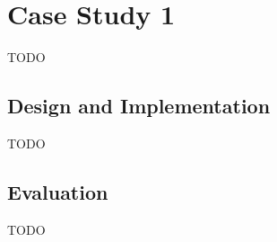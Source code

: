 \section{Case Study 1}

TODO

\subsection{Design and Implementation}

TODO

\subsection{Evaluation}

TODO